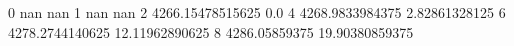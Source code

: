 0 nan nan
1 nan nan
2 4266.15478515625 0.0
4 4268.9833984375 2.82861328125
6 4278.2744140625 12.11962890625
8 4286.05859375 19.90380859375
